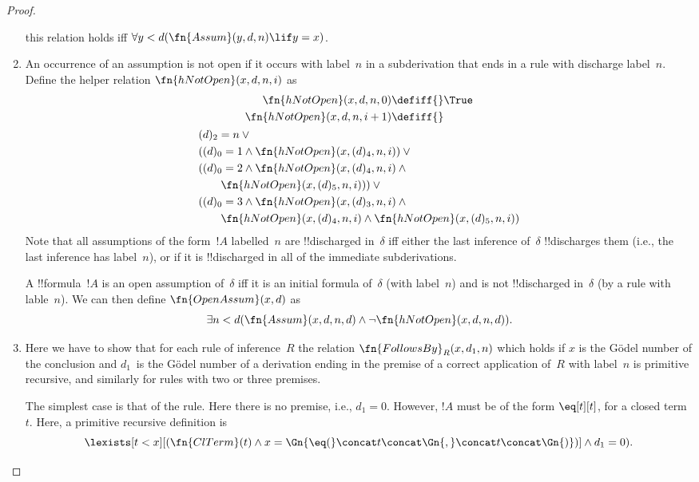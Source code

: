 \documentclass[../../../include/open-logic-section]{subfiles}
\begin{document}
\begin{proof}
\begin{enumerate}
  this relation holds iff $\forall y<d(\fn{Assum}(y, d, n) \lif y =
  x)$.
\item An occurrence of an assumption is not open if it occurs
  with label~$n$ in a subderivation that ends in a rule with discharge
  label~$n$. Define the helper relation $\fn{hNotOpen}(x, d, n, i)$
  as
  \begin{multline*}
    \begin{aligned}
    \fn{hNotOpen}(x, d, n, 0) \defiff {} & \True\\   
    \fn{hNotOpen}(x, d, n, i+1) \defiff {} 
    \end{aligned}\\
    \begin{aligned}
      & (d)_2 = n \lor {}\\
      & ((d)_0 = 1 \land \fn{hNotOpen}(x, (d)_4, n, i)) \lor {}\\
      & ((d)_0 = 2 \land \fn{hNotOpen}(x, (d)_4, n, i) \land {}\\
      & \qquad\fn{hNotOpen}(x, (d)_5, n, i))) \lor {}\\
      & ((d)_0 = 3 \land \fn{hNotOpen}(x, (d)_3, n, i) \land {}\\
      & \qquad \fn{hNotOpen}(x, (d)_4, n, i) \land
      \fn{hNotOpen}(x, (d)_5, n, i))\\
    \end{aligned}
  \end{multline*}
  Note that all assumptions of the form~$!A$ labelled~$n$ are
  !!{discharged} in~$\delta$ iff either the last inference of~$\delta$
  !!{discharge}s them (i.e., the last inference has label~$n$), or if
  it is !!{discharged} in all of the immediate subderivations.

  A !!{formula}~$!A$ is an open assumption of~$\delta$ iff it is an
  initial formula of~$\delta$ (with label~$n$) and is not
  !!{discharged} in~$\delta$ (by a rule with lable~$n$). We can then
  define $\fn{OpenAssum}(x, d)$ as
  \[
  \exists n<d(\fn{Assum}(x,d,n,d)
  \land \lnot\fn{hNotOpen}(x, d, n, d)).
  \]
\item Here we have to show that for each rule of inference~$R$ the
  relation $\fn{FollowsBy}_R(x, d_1, n)$ which holds if $x$ is the
  G\"odel number of the conclusion and $d_1$~is the G\"odel number of a
  derivation ending in the premise of a correct application of~$R$
  with label~$n$ is primitive recursive, and similarly for rules with
  two or three premises.

  The simplest case is that of the \Intro{\eq} rule. Here there is no
  premise, i.e., $d_1 = 0$.  However, $!A$ must be of the form
  $\eq[t][t]$, for a closed term~$t$. Here, a primitive recursive
  definition is
  \[
  \lexists[t<x][(\fn{ClTerm}(t) \land x = 
    \Gn{\eq(} \concat t \concat \Gn{,} \concat t \concat \Gn{)})]
  \land d_1 = 0).
  \]


\end{enumerate}
\end{proof}
\end{document}
